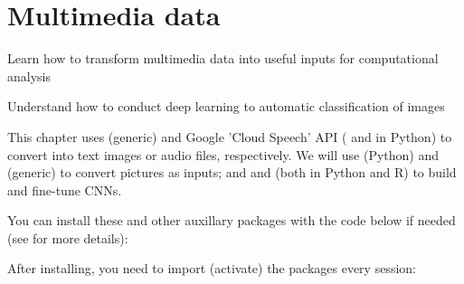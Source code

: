 \chapter{Multimedia data}
\label{chap:image}

\begin{abstract}{Abstract}
Digitally collected data often does not only contain texts, but also audio, images and videos. Instead of using only textual features as we did in previous chapters, we could as well use, for instance, pixel values
to analyse images. First, we will see how to use existing libraries, commercial services or API's to conduct multimedia analysis (i.e. optical character recognition, speech-to-text or object recognition). Then we will show how to store, represent and convert image data in order to use it as an input in our computational analysis.  We will focus on image analysis using machine learning classification techniques based on deep learning, and will explain how to build (or fine-tune) a Convolutional Neural Network (CNN) by ourselves. 
\end{abstract}


\begin{objectives}
\item Learn how to transform multimedia data into useful inputs for computational analysis
\item Understand how to conduct deep learning to automatic classification of images
\end{objectives}

\begin{feature}
This chapter uses  (generic) and  Google 'Cloud Speech' API ( and  in Python) to convert into text images or audio files, respectively. We will use  (Python) and  (generic) to convert pictures as inputs; and  and  (both in Python and R) to build and fine-tune CNNs. 

You can install these and other auxillary packages with the code below if needed  (see  for more details):


\noindent After installing, you need to import (activate) the packages every session:


\end{feature}









